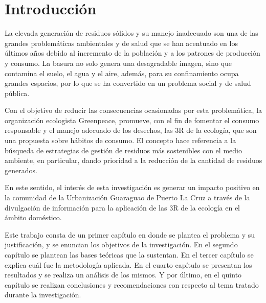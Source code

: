 {\setlength{\parskip}{-0.5cm}
\chapter*{Introducción}

La elevada generación de residuos sólidos y su manejo inadecuado son una de las grandes problemáticas ambientales y de salud que se han acentuado en los últimos años debido al incremento de la población y a los patrones de producción y consumo. La basura no solo genera una desagradable imagen, sino que contamina el suelo, el agua y el aire, además, para su confinamiento ocupa grandes espacios, por lo que se ha convertido en un problema social y de salud pública.
}

Con  el objetivo de reducir las consecuencias ocasionadas por esta problemática, la organización ecologista Greenpeace, promueve, con el fin de fomentar el consumo responsable y el manejo adecuado de los desechos, las 3R de la ecología, que son una propuesta sobre hábitos de consumo. El concepto hace referencia a la búsqueda de estrategias de gestión de residuos más sostenibles con el medio ambiente, en particular, dando prioridad a la reducción de la cantidad de residuos generados.

En este sentido, el interés de esta investigación es generar un impacto positivo en la comunidad de la Urbanización Guaraguao de Puerto La Cruz a través de la divulgación de información para la aplicación de las 3R de la ecología en el ámbito doméstico.

Este trabajo consta de un primer capítulo en donde se plantea el problema y su justificación, y se enuncian los objetivos de la investigación. En el segundo capítulo se plantean las bases teóricas que la sustentan. En el tercer capítulo se explica cuál fue la metodología aplicada. En el cuarto capítulo se presentan los resultados y se realiza un análisis de los mismos. Y por último, en el quinto capítulo se realizan conclusiones y recomendaciones con respecto al tema tratado durante la investigación.

\newpage